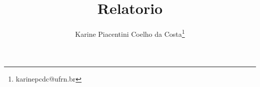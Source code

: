 \documentclass[12pt,openright]{report}
\title{\bf {Relatorio}}
\author{Karine Piacentini Coelho da Costa\footnote{karinepcdc@ufrn.br}}%
\begin{document}
%
\maketitle


\newpage
{}
\tableofcontents

\newpage
%

\newpage









%


% 

\renewcommand{\baselinestretch}{1}
\normalsize

%
%
%
%
%
%
%
%
%
%
%
%
%

\renewcommand{\baselinestretch}{1.5}
\normalsize
\end{document}
